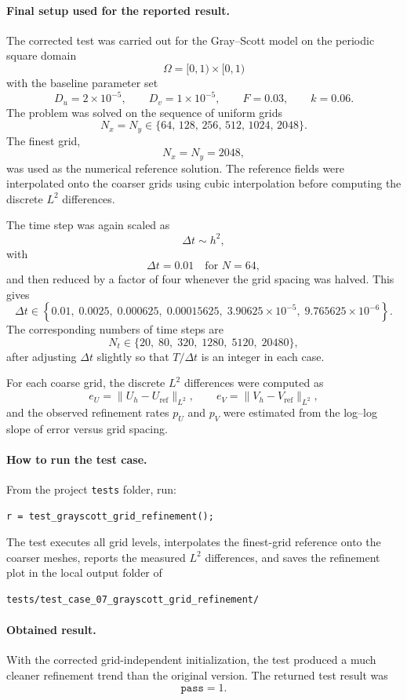 \paragraph{Final setup used for the reported result.}
The corrected test was carried out for the Gray--Scott model on the periodic square domain
\[
\Omega = [0,1)\times[0,1)
\]
with the baseline parameter set
\[
D_u = 2\times 10^{-5}, \qquad
D_v = 1\times 10^{-5}, \qquad
F = 0.03, \qquad
k = 0.06.
\]
The problem was solved on the sequence of uniform grids
\[
N_x=N_y \in \{64,\,128,\,256,\,512,\,1024,\,2048\}.
\]
The finest grid,
\[
N_x=N_y=2048,
\]
was used as the numerical reference solution. The reference fields were interpolated onto the coarser grids using cubic interpolation before computing the discrete \(L^2\) differences.

The time step was again scaled as
\[
\Delta t \sim h^2,
\]
with
\[
\Delta t = 0.01 \quad \text{for } N=64,
\]
and then reduced by a factor of four whenever the grid spacing was halved. This gives
\[
\Delta t \in \left\{
0.01,\;
0.0025,\;
0.000625,\;
0.00015625,\;
3.90625\times 10^{-5},\;
9.765625\times 10^{-6}
\right\}.
\]
The corresponding numbers of time steps are
\[
N_t \in \{20,\;80,\;320,\;1280,\;5120,\;20480\},
\]
after adjusting \(\Delta t\) slightly so that \(T/\Delta t\) is an integer in each case.

For each coarse grid, the discrete \(L^2\) differences were computed as
\[
e_U = \|U_h - U_{\mathrm{ref}}\|_{L^2}, \qquad
e_V = \|V_h - V_{\mathrm{ref}}\|_{L^2},
\]
and the observed refinement rates \(p_U\) and \(p_V\) were estimated from the log--log slope of error versus grid spacing.

\paragraph{How to run the test case.}
From the project \texttt{tests} folder, run:
\begin{verbatim}
r = test_grayscott_grid_refinement();
\end{verbatim}

The test executes all grid levels, interpolates the finest-grid reference onto the coarser meshes, reports the measured \(L^2\) differences, and saves the refinement plot in the local output folder of
\begin{verbatim}
tests/test_case_07_grayscott_grid_refinement/
\end{verbatim}

\paragraph{Obtained result.}
With the corrected grid-independent initialization, the test produced a much cleaner refinement trend than the original version. The returned test result was
\[
\texttt{pass} = 1.
\]


